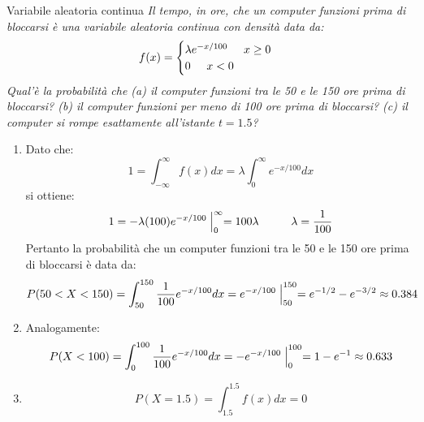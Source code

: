 \begin{Example}{Variabile aleatoria continua}{}
    \textit{Il tempo, in ore, che un computer funzioni prima di bloccarsi è una variabile aleatoria continua con densità data da:}
    \begin{equation*}
        f(x)=\begin{cases}
            \lambda e^{-x/100}\hspace{0.5cm}x\geq0\\0\hspace{0.5cm}x<0
        \end{cases}
    \end{equation*}
    \textit{Qual'è la probabilità che (a) il computer funzioni tra le 50 e le 150 ore prima di bloccarsi? (b) il computer funzioni per meno di 100 ore prima di bloccarsi? (c) il computer si rompe esattamente all'istante $t=1.5$?}

    \begin{enumerate}[label=(\alph*)]
        \item Dato che:
        \begin{equation*}
            1=\int^\infty_{-\infty}f(x)dx=\lambda\int^\infty_0e^{-x/100}dx
        \end{equation*}
        si ottiene:
        \begin{equation*}
            1=-\lambda(100)e^{-x/100}\Bigm\lvert^\infty_0=100\lambda\hspace{1cm}\lambda=\frac{1}{100}
        \end{equation*}
        Pertanto la probabilità che un computer funzioni tra le 50 e le 150 ore prima di bloccarsi è data da:
        \begin{equation*}
            P(50<X<150)=\int^{150}_{50}\frac{1}{100}e^{-x/100}dx=e^{-x/100}\Bigm\lvert^{150}_{50}=e^{-1/2}-e^{-3/2}\approx 0.384
        \end{equation*}
        \item Analogamente:
        \begin{equation*}
            P(X<100)=\int^{100}_0\frac{1}{100}e^{-x/100}dx=-e^{-x/100}\Bigm\lvert^{100}_0=1-e^{-1}\approx0.633
        \end{equation*}
        \item
        \begin{equation*}
            P(X=1.5)=\int^{1.5}_{1.5}f(x)dx=0
        \end{equation*}
    \end{enumerate}
\end{Example}

